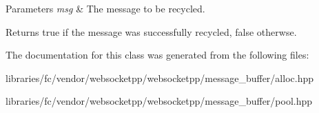 \begin{DoxyParams}{Parameters}
{\em msg} & The message to be recycled.\\
\hline
\end{DoxyParams}
\begin{DoxyReturn}{Returns}
true if the message was successfully recycled, false otherwse. 
\end{DoxyReturn}


The documentation for this class was generated from the following files\+:\begin{DoxyCompactItemize}
\item 
libraries/fc/vendor/websocketpp/websocketpp/message\+\_\+buffer/alloc.\+hpp\item 
libraries/fc/vendor/websocketpp/websocketpp/message\+\_\+buffer/pool.\+hpp\end{DoxyCompactItemize}
